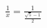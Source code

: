 \documentclass[preview]{standalone}
\begin{document}
\begin{align*}
\frac{1}{x} = \frac{1}{\frac{\sqrt{5} - 1}{2}}
\end{align*}
\end{document}
